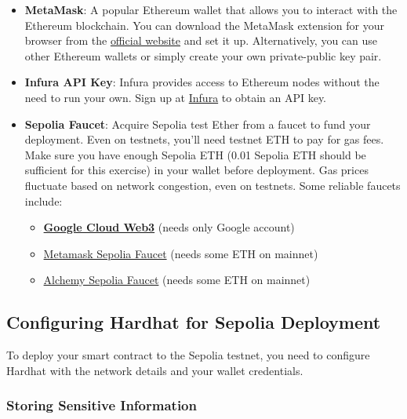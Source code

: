 \documentclass[12pt]{article}
\begin{document}
\begin{itemize}
    \item \textbf{MetaMask}: A popular Ethereum wallet that allows you to interact with the Ethereum blockchain. You can download the MetaMask extension for your browser from the \href{https://metamask.io/}{official website} and set it up. Alternatively, you can use other Ethereum wallets or simply create your own private-public key pair.

    \item \textbf{Infura API Key}: Infura provides access to Ethereum nodes without the need to run your own. Sign up at \href{https://infura.io/}{Infura} to obtain an API key.

    \item \textbf{Sepolia Faucet}: Acquire Sepolia test Ether from a faucet to fund your deployment. Even on testnets, you'll need testnet ETH to pay for gas fees. Make sure you have enough Sepolia ETH (0.01 Sepolia ETH should be sufficient for this exercise) in your wallet before deployment. Gas prices fluctuate based on network congestion, even on testnets. Some reliable faucets include:
          \begin{itemize}
              \item \href{https://cloud.google.com/application/web3/faucet/ethereum/sepolia}{\textbf{Google Cloud Web3}} (needs only Google account)
              \item \href{https://docs.metamask.io/developer-tools/faucet/}{Metamask Sepolia Faucet} (needs some ETH on mainnet)
              \item \href{https://www.alchemy.com/faucets/ethereum-sepolia}{Alchemy Sepolia Faucet}  (needs some ETH on mainnet)
          \end{itemize}
\end{itemize}

\subsection{Configuring Hardhat for Sepolia Deployment}

To deploy your smart contract to the Sepolia testnet, you need to configure
Hardhat with the network details and your wallet credentials.

\subsubsection*{Storing Sensitive Information}
\end{document}

